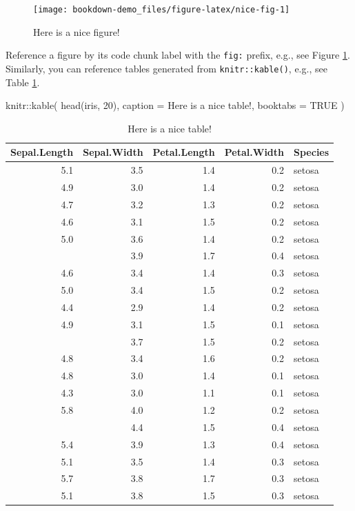 \documentclass[
]{book}
\newenvironment{Shaded}{\begin{snugshade}}{\end{snugshade}}
\newcommand{\AttributeTok}[1]{\textcolor[rgb]{0.77,0.63,0.00}{#1}}
\newcommand{\ConstantTok}[1]{\textcolor[rgb]{0.00,0.00,0.00}{#1}}
\newcommand{\DecValTok}[1]{\textcolor[rgb]{0.00,0.00,0.81}{#1}}
\newcommand{\FunctionTok}[1]{\textcolor[rgb]{0.00,0.00,0.00}{#1}}
\newcommand{\NormalTok}[1]{#1}
\newcommand{\SpecialCharTok}[1]{\textcolor[rgb]{0.00,0.00,0.00}{#1}}
\newcommand{\StringTok}[1]{\textcolor[rgb]{0.31,0.60,0.02}{#1}}
\begin{document}
\begin{figure}

{\centering \texttt{[image: bookdown-demo\_files/figure-latex/nice-fig-1]} 

}

\caption{Here is a nice figure!}\label{fig:nice-fig}
\end{figure}

Reference a figure by its code chunk label with the \texttt{fig:} prefix, e.g., see Figure \ref{fig:nice-fig}. Similarly, you can reference tables generated from \texttt{knitr::kable()}, e.g., see Table \ref{tab:nice-tab}.

\begin{Shaded}
\begin{Highlighting}[]
\NormalTok{knitr}\SpecialCharTok{::}\FunctionTok{kable}\NormalTok{(}
  \FunctionTok{head}\NormalTok{(iris, }\DecValTok{20}\NormalTok{), }\AttributeTok{caption =} \StringTok{\textquotesingle{}Here is a nice table!\textquotesingle{}}\NormalTok{,}
  \AttributeTok{booktabs =} \ConstantTok{TRUE}
\NormalTok{)}
\end{Highlighting}
\end{Shaded}

\begin{table}

\caption{\label{tab:nice-tab}Here is a nice table!}
\centering
\begin{tabular}[t]{rrrrl}
\toprule
Sepal.Length & Sepal.Width & Petal.Length & Petal.Width & Species\\
\midrule
5.1 & 3.5 & 1.4 & 0.2 & setosa\\
4.9 & 3.0 & 1.4 & 0.2 & setosa\\
4.7 & 3.2 & 1.3 & 0.2 & setosa\\
4.6 & 3.1 & 1.5 & 0.2 & setosa\\
5.0 & 3.6 & 1.4 & 0.2 & setosa\\
\addlinespace
5.4 & 3.9 & 1.7 & 0.4 & setosa\\
4.6 & 3.4 & 1.4 & 0.3 & setosa\\
5.0 & 3.4 & 1.5 & 0.2 & setosa\\
4.4 & 2.9 & 1.4 & 0.2 & setosa\\
4.9 & 3.1 & 1.5 & 0.1 & setosa\\
\addlinespace
5.4 & 3.7 & 1.5 & 0.2 & setosa\\
4.8 & 3.4 & 1.6 & 0.2 & setosa\\
4.8 & 3.0 & 1.4 & 0.1 & setosa\\
4.3 & 3.0 & 1.1 & 0.1 & setosa\\
5.8 & 4.0 & 1.2 & 0.2 & setosa\\
\addlinespace
5.7 & 4.4 & 1.5 & 0.4 & setosa\\
5.4 & 3.9 & 1.3 & 0.4 & setosa\\
5.1 & 3.5 & 1.4 & 0.3 & setosa\\
5.7 & 3.8 & 1.7 & 0.3 & setosa\\
5.1 & 3.8 & 1.5 & 0.3 & setosa\\
\bottomrule
\end{tabular}
\end{table}
\end{document}
